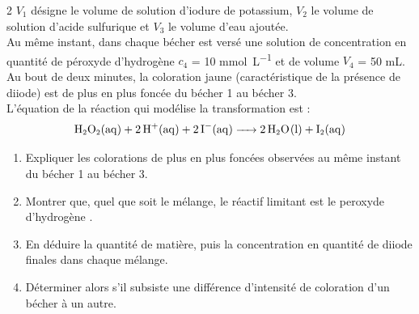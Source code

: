 \documentclass[a4paper,11pt,fleqn]{article}%
\begin{document}
\begin{multicols}{2}
$V_1$ désigne le volume de solution d'iodure de potassium, $V_2$ le volume de solution d'acide sulfurique et $V_3$ le volume d'eau ajoutée.\\
Au même instant, dans chaque bécher est versé une solution de concentration en quantité de péroxyde d'hydrogène $c_4$ = \num{10} \unit{\milli\mole\per\liter} et de volume $V_4$ = \num{50} \unit{\milli\liter}. Au bout de deux minutes, la coloration jaune (caractéristique de la présence de diiode) est de plus en plus foncée du bécher 1 au bécher 3.\\
L'équation de la réaction qui modélise la transformation est :
$$\small \ce{H2O2(aq) + 2H+(aq) + 2I-(aq) -> 2H2O(l) + I2(aq)} $$
\begin{enumerate}
    \item Expliquer les colorations de plus en plus foncées observées au même instant du bécher 1 au bécher 3.
    \item Montrer que, quel que soit le mélange, le réactif limitant est le peroxyde d'hydrogène .
    \item En déduire la quantité de matière, puis la concentration en quantité de diiode finales dans chaque mélange.
    \item Déterminer alors s'il subsiste une différence d'intensité de coloration d'un bécher à un autre.
\end{enumerate}


\end{multicols}
\end{document}
